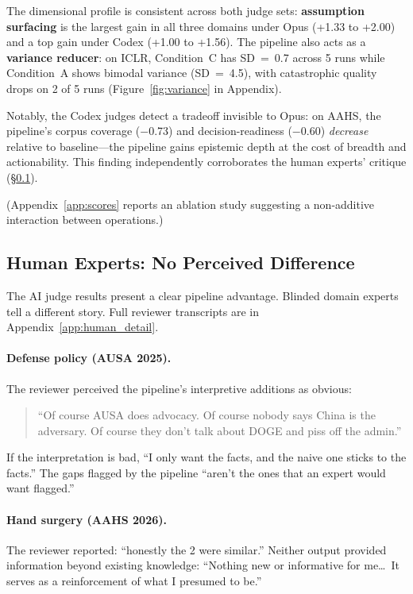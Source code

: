 \documentclass{article}
\begin{document}
The dimensional profile is consistent across both judge sets: \textbf{assumption surfacing} is the largest gain in all three domains under Opus (+1.33 to +2.00) and a top gain under Codex (+1.00 to +1.56). The pipeline also acts as a \textbf{variance reducer}: on ICLR, Condition~C has SD~=~0.7 across 5 runs while Condition~A shows bimodal variance (SD~=~4.5), with catastrophic quality drops on 2 of 5 runs (Figure~\ref{fig:variance} in Appendix).

Notably, the Codex judges detect a tradeoff invisible to Opus: on AAHS, the pipeline's corpus coverage ($-$0.73) and decision-readiness ($-$0.60) \textit{decrease} relative to baseline---the pipeline gains epistemic depth at the cost of breadth and actionability. This finding independently corroborates the human experts' critique (\S\ref{sec:human}).

(Appendix~\ref{app:scores} reports an ablation study suggesting a non-additive interaction between operations.)

\subsection{Human Experts: No Perceived Difference}
\label{sec:human}

The AI judge results present a clear pipeline advantage. Blinded domain experts tell a different story. Full reviewer transcripts are in Appendix~\ref{app:human_detail}.

\paragraph{Defense policy (AUSA 2025).} The reviewer perceived the pipeline's interpretive additions as obvious:

\begin{quote}
``Of course AUSA does advocacy. Of course nobody says China is the adversary. Of course they don't talk about DOGE and piss off the admin.''
\end{quote}

If the interpretation is bad, ``I only want the facts, and the naive one sticks to the facts.'' The gaps flagged by the pipeline ``aren't the ones that an expert would want flagged.''

\paragraph{Hand surgery (AAHS 2026).} The reviewer reported: ``honestly the 2 were similar.'' Neither output provided information beyond existing knowledge: ``Nothing new or informative for me\ldots\ It serves as a reinforcement of what I presumed to be.''
\end{document}
